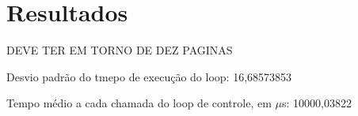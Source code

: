 \section{Resultados}
\label{sec:resultados}

DEVE TER EM TORNO DE DEZ PAGINAS

Desvio padrão do tmepo de execução do loop: 16,68573853

Tempo médio a cada chamada do loop de controle, em $\mu$s: 10000,03822
